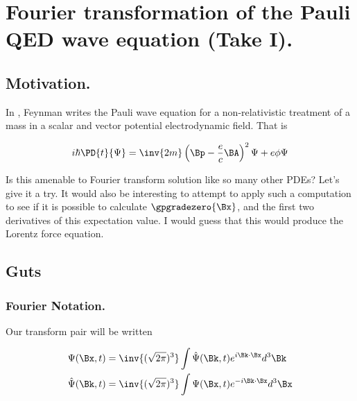 
%

\chapter{Fourier transformation of the Pauli QED wave equation (Take I).}
\label{chap:pauliFourier}
{}
\date{May 29, 2010}

\beginArtNoToc

\section{Motivation.}

In \cite{feynman1961qed}, Feynman writes the Pauli wave equation for a non-relativistic treatment of a mass in a scalar and vector potential electrodynamic field.  That is

\begin{align}\label{eqn:pauliFourier:1}
i \hbar \PD{t}{\Psi} = \inv{2m} \left( \Bp - \frac{e}{c} \BA \right)^2 \Psi + e \phi \Psi
\end{align}

Is this amenable to Fourier transform solution like so many other PDEs?  Let's give it a try.  It would also be interesting to attempt to apply such a computation to see if it is possible to calculate $\gpgradezero{\Bx}$, and the first two derivatives of this expectation value.  I would guess that this would produce the Lorentz force equation.

\section{Guts}
\subsection{Fourier Notation.}

Our transform pair will be written

\begin{subequations}
\begin{align}
\Psi(\Bx, t) &= \inv{(\sqrt{2 \pi})^3} \int \hat{\Psi}(\Bk, t) e^{i \Bk \cdot \Bx} d^3 \Bk \label{eqn:pauliFourier:2a} \\
\hat{\Psi}(\Bk, t) &= \inv{(\sqrt{2 \pi})^3} \int \Psi(\Bx, t) e^{-i \Bk \cdot \Bx} d^3 \Bx \label{eqn:pauliFourier:2b}
\end{align}
\end{subequations}

